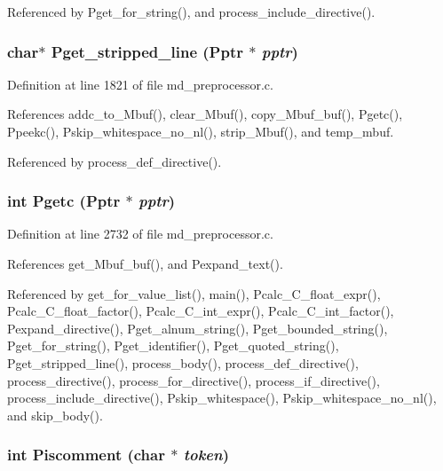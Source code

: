 Referenced by Pget\_\-for\_\-string(), and process\_\-include\_\-directive().
\subsubsection{\setlength{\rightskip}{0pt plus 5cm}char$\ast$ Pget\_\-stripped\_\-line (\bf{Pptr} $\ast$ {\em pptr})}\label{md__preprocessor_8h_d3ce20c32087bcde00f8e7d94653ddde}




Definition at line 1821 of file md\_\-preprocessor.c.

References addc\_\-to\_\-Mbuf(), clear\_\-Mbuf(), copy\_\-Mbuf\_\-buf(), Pgetc(), Ppeekc(), Pskip\_\-whitespace\_\-no\_\-nl(), strip\_\-Mbuf(), and temp\_\-mbuf.

Referenced by process\_\-def\_\-directive().
\subsubsection{\setlength{\rightskip}{0pt plus 5cm}int Pgetc (\bf{Pptr} $\ast$ {\em pptr})}\label{md__preprocessor_8h_b8460f9e0b884163e92dad174040ead0}




Definition at line 2732 of file md\_\-preprocessor.c.

References get\_\-Mbuf\_\-buf(), and Pexpand\_\-text().

Referenced by get\_\-for\_\-value\_\-list(), main(), Pcalc\_\-C\_\-float\_\-expr(), Pcalc\_\-C\_\-float\_\-factor(), Pcalc\_\-C\_\-int\_\-expr(), Pcalc\_\-C\_\-int\_\-factor(), Pexpand\_\-directive(), Pget\_\-alnum\_\-string(), Pget\_\-bounded\_\-string(), Pget\_\-for\_\-string(), Pget\_\-identifier(), Pget\_\-quoted\_\-string(), Pget\_\-stripped\_\-line(), process\_\-body(), process\_\-def\_\-directive(), process\_\-directive(), process\_\-for\_\-directive(), process\_\-if\_\-directive(), process\_\-include\_\-directive(), Pskip\_\-whitespace(), Pskip\_\-whitespace\_\-no\_\-nl(), and skip\_\-body().
\subsubsection{\setlength{\rightskip}{0pt plus 5cm}int Piscomment (char $\ast$ {\em token})}\label{md__preprocessor_8h_d9dade1489beeca1d82f0aeda068941a}


